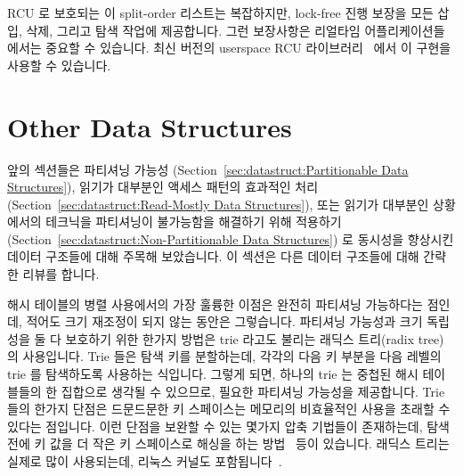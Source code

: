 RCU 로 보호되는 이 split-order 리스트는 복잡하지만, lock-free 진행 보장을 모든
삽입, 삭제, 그리고 탐색 작업에 제공합니다.
그런 보장사항은 리얼타임 어플리케이션들에서는 중요할 수 있습니다.
최신 버전의 userspace RCU 라이브러리~\cite{MathieuDesnoyers2009URCU} 에서 이
구현을 사용할 수 있습니다.

\section{Other Data Structures}
\label{sec:datastruct:Other Data Structures}

앞의 섹션들은 파티셔닝 가능성
(Section~\ref{sec:datastruct:Partitionable Data Structures}),
읽기가 대부분인 액세스 패턴의 효과적인 처리
(Section~\ref{sec:datastruct:Read-Mostly Data Structures}),
또는 읽기가 대부분인 상황에서의 테크닉을 파티셔닝이 불가능함을 해결하기 위해
적용하기
(Section~\ref{sec:datastruct:Non-Partitionable Data Structures})
로 동시성을 향상시킨 데이터 구조들에 대해 주목해 보았습니다.
이 섹션은 다른 데이터 구조들에 대해 간략한 리뷰를 합니다.

해시 테이블의 병렬 사용에서의 가장 훌륭한 이점은 완전히 파티셔닝 가능하다는
점인데, 적어도 크기 재조정이 되지 않는 동안은 그렇습니다.
파티셔닝 가능성과 크기 독립성을 둘 다 보호하기 위한 한가지 방법은 trie 라고도
불리는 래딕스 트리(radix tree) 의 사용입니다.
Trie 들은 탐색 키를 분할하는데, 각각의 다음 키 부분을 다음 레벨의 trie 를
탐색하도록 사용하는 식입니다.
그렇게 되면, 하나의 trie 는 중첩된 해시 테이블들의 한 집합으로 생각될 수
있으므로, 필요한 파티셔닝 가능성을 제공합니다.
Trie 들의 한가지 단점은 드문드문한 키 스페이스는 메모리의 비효율적인 사용을
초래할 수 있다는 점입니다.
이런 단점을 보완할 수 있는 몇가지 압축 기법들이 존재하는데, 탐색 전에 키 값을
더 작은 키 스페이스로 해싱을 하는 방법~\cite{RobertOlsson2006a} 등이 있습니다.
래딕스 트리는 실제로 많이 사용되는데, 리눅스 커널도
포함됩니다~\cite{NickPiggin2006radixtree}.
\iffalse

